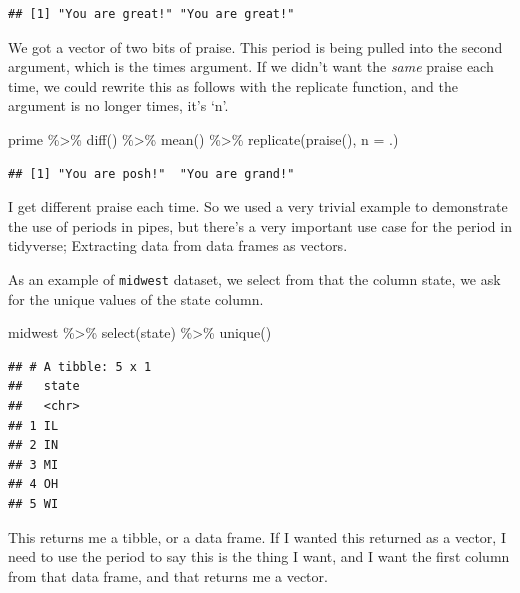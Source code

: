 \documentclass[
]{article}
\newenvironment{Shaded}{\begin{snugshade}}{\end{snugshade}}
\newcommand{\AttributeTok}[1]{\textcolor[rgb]{0.77,0.63,0.00}{#1}}
\newcommand{\FunctionTok}[1]{\textcolor[rgb]{0.00,0.00,0.00}{#1}}
\newcommand{\NormalTok}[1]{#1}
\newcommand{\SpecialCharTok}[1]{\textcolor[rgb]{0.00,0.00,0.00}{#1}}
\begin{document}
\begin{verbatim}
## [1] "You are great!" "You are great!"
\end{verbatim}

We got a vector of two bits of praise. This period is being pulled into the second argument, which is the times argument. If we didn't want the \emph{same} praise each time, we could rewrite this as follows with the replicate function, and the argument is no longer times, it's `n'.

\begin{Shaded}
\begin{Highlighting}[]
\NormalTok{prime }\SpecialCharTok{\%\textgreater{}\%}
  \FunctionTok{diff}\NormalTok{() }\SpecialCharTok{\%\textgreater{}\%}
  \FunctionTok{mean}\NormalTok{() }\SpecialCharTok{\%\textgreater{}\%}
  \FunctionTok{replicate}\NormalTok{(}\FunctionTok{praise}\NormalTok{(), }\AttributeTok{n =}\NormalTok{ .)}
\end{Highlighting}
\end{Shaded}

\begin{verbatim}
## [1] "You are posh!"  "You are grand!"
\end{verbatim}

I get different praise each time. So we used a very trivial example to demonstrate the use of periods in pipes, but there's a very important use case for the period in tidyverse; Extracting data from data frames as vectors.

As an example of \texttt{midwest} dataset, we select from that the column state, we ask for the unique values of the state column.

\begin{Shaded}
\begin{Highlighting}[]
\NormalTok{midwest }\SpecialCharTok{\%\textgreater{}\%}
  \FunctionTok{select}\NormalTok{(state) }\SpecialCharTok{\%\textgreater{}\%}
  \FunctionTok{unique}\NormalTok{()}
\end{Highlighting}
\end{Shaded}

\begin{verbatim}
## # A tibble: 5 x 1
##   state
##   <chr>
## 1 IL   
## 2 IN   
## 3 MI   
## 4 OH   
## 5 WI
\end{verbatim}

This returns me a tibble, or a data frame. If I wanted this returned as a vector, I need to use the period to say this is the thing I want, and I want the first column from that data frame, and that returns me a vector.
\end{document}

